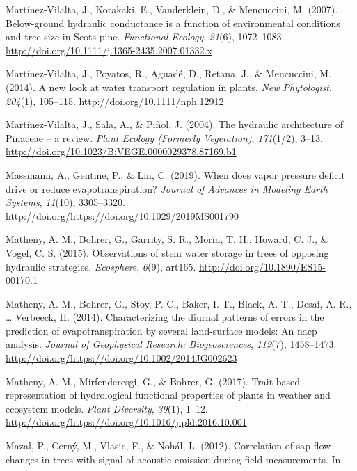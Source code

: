 \documentclass[11pt,twoside]{reedthesis}
\begin{document}
\hypertarget{ref-Martinez-Vilalta2007}{}
Martínez-Vilalta, J., Korakaki, E., Vanderklein, D., \& Mencuccini, M.
(2007). Below-ground hydraulic conductance is a function of
environmental conditions and tree size in Scots pine. \emph{Functional
Ecology}, \emph{21}(6), 1072--1083.
\url{http://doi.org/10.1111/j.1365-2435.2007.01332.x}

\hypertarget{ref-martinez-vilalta_new_2014}{}
Martínez-Vilalta, J., Poyatos, R., Aguadé, D., Retana, J., \&
Mencuccini, M. (2014). A new look at water transport regulation in
plants. \emph{New Phytologist}, \emph{204}(1), 105--115.
\url{http://doi.org/10.1111/nph.12912}

\hypertarget{ref-martinez-vilalta_hydraulic_2004}{}
Martínez-Vilalta, J., Sala, A., \& Piñol, J. (2004). The hydraulic
architecture of Pinaceae -- a review. \emph{Plant Ecology (Formerly
Vegetation)}, \emph{171}(1/2), 3--13.
\url{http://doi.org/10.1023/B:VEGE.0000029378.87169.b1}

\hypertarget{ref-Massmann2019}{}
Massmann, A., Gentine, P., \& Lin, C. (2019). When does vapor pressure
deficit drive or reduce evapotranspiration? \emph{Journal of Advances in
Modeling Earth Systems}, \emph{11}(10), 3305--3320.
\url{http://doi.org/https://doi.org/10.1029/2019MS001790}

\hypertarget{ref-matheny_observations_2015}{}
Matheny, A. M., Bohrer, G., Garrity, S. R., Morin, T. H., Howard, C. J.,
\& Vogel, C. S. (2015). Observations of stem water storage in trees of
opposing hydraulic strategies. \emph{Ecosphere}, \emph{6}(9), art165.
\url{http://doi.org/10.1890/ES15-00170.1}

\hypertarget{ref-Matheny2014}{}
Matheny, A. M., Bohrer, G., Stoy, P. C., Baker, I. T., Black, A. T.,
Desai, A. R., \ldots{} Verbeeck, H. (2014). Characterizing the diurnal
patterns of errors in the prediction of evapotranspiration by several
land-surface models: An nacp analysis. \emph{Journal of Geophysical
Research: Biogeosciences}, \emph{119}(7), 1458--1473.
\url{http://doi.org/https://doi.org/10.1002/2014JG002623}

\hypertarget{ref-Matheny2017}{}
Matheny, A. M., Mirfenderesgi, G., \& Bohrer, G. (2017). Trait-based
representation of hydrological functional properties of plants in
weather and ecosystem models. \emph{Plant Diversity}, \emph{39}(1),
1--12. \url{http://doi.org/https://doi.org/10.1016/j.pld.2016.10.001}

\hypertarget{ref-Mazal2012}{}
Mazal, P., Cerný, M., Vlasic, F., \& Nohál, L. (2012). Correlation of
sap flow changes in trees with signal of acoustic emission during field
measurements. In.
\end{document}
